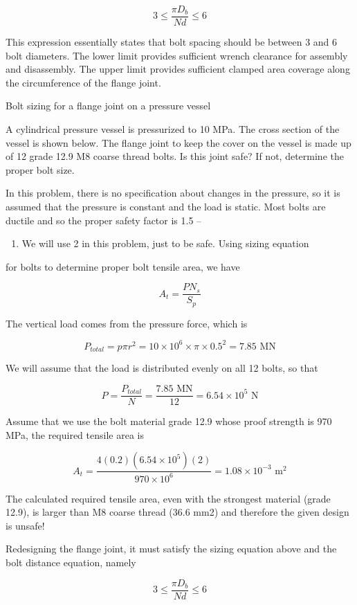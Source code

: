\documentclass[a4paper,openany,12pt]{book}
\begin{document}
{{$$3 \leqslant \frac{\pi D_b}{Nd} \leqslant 6$$

This expression essentially states that bolt spacing should be between 3
and 6 bolt diameters. The lower limit provides sufficient wrench
clearance for assembly and disassembly. The upper limit provides
sufficient clamped area coverage along the circumference of the flange
joint.

Bolt sizing for a flange joint on a pressure vessel

A cylindrical pressure vessel is pressurized to 10 MPa. The cross
section of the vessel is shown below. The flange joint to keep the cover
on the vessel is made up of 12 grade 12.9 M8 coarse thread bolts. Is
this joint safe? If not, determine the proper bolt size.


In this problem, there is no specification about changes in the
pressure, so it is assumed that the pressure is constant and the load is
static. Most bolts are ductile and so the proper safety factor is 1.5 --
\begin{enumerate}
\item We will use 2 in this problem, just to be safe. Using sizing equation
\end{enumerate}
for bolts to determine proper bolt tensile area, we have

$$A_t = \frac{PN_s}{S_p}$$

The vertical load comes from the pressure force, which is

$$P_{total} = p\pi r^2 = 10 \times 10^6 \times \pi  \times 0.5^2 = 7.85\text{ MN}$$

We will assume that the load is distributed evenly on all 12 bolts, so
that

$$P = \frac{P_{total}}{N} = \frac{7.85 \text{ MN}}{12} = 6.54 \times
  {10^5}\text{ N}$$

Assume that we use the bolt material grade 12.9 whose proof strength is
970 MPa, the required tensile area is

$$A_t = \frac{4(0.2)(6.54 \times 10^5)(2)}{970 \times 10^6} = 1.08 \times 10^{-3} \text{ m}^2$$

The calculated required tensile area, even with the strongest material
(grade 12.9), is larger than M8 coarse thread (36.6 mm2) and therefore
the given design is unsafe!

Redesigning the flange joint, it must satisfy the sizing equation above
and the bolt distance equation, namely

$$3 \leqslant \frac{\pi D_b}{Nd} \leqslant 6$$

}}
\end{document}
